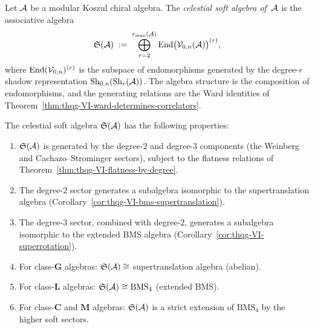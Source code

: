 \begin{definition}
\label{def:thqg-VI-celestial-soft-algebra}
Let $\mathcal{A}$ be a modular Koszul chiral algebra. The
\emph{celestial soft algebra of~$\mathcal{A}$} is the associative algebra
\begin{equation}\label{eq:thqg-VI-celestial-soft-algebra}
\mathfrak{S}(\mathcal{A})
\;:=\;
\bigoplus_{r=2}^{r_{\max}(\mathcal{A})}
\operatorname{End}\bigl(\mathcal{V}_{0,n}(\mathcal{A})\bigr)^{(r)},
\end{equation}
where $\operatorname{End}(\mathcal{V}_{0,n})^{(r)}$ is the subspace of endomorphisms
generated by the degree-$r$ shadow representation
$\operatorname{Sh}_{0,n}(\operatorname{Sh}_r(\mathcal{A}))$. The algebra structure is the
composition of endomorphisms, and the generating relations are
the Ward identities of
Theorem~\ref{thm:thqg-VI-ward-determines-correlators}.
\end{definition}

\begin{proposition}
\label{prop:thqg-VI-celestial-structure}
The celestial soft algebra $\mathfrak{S}(\mathcal{A})$ has the following
properties:
\begin{enumerate}[label=\textup{(\roman*)}]
\item $\mathfrak{S}(\mathcal{A})$ is generated by the degree-$2$ and
 degree-$3$ components (the Weinberg and Cachazo--Strominger
 sectors), subject to the flatness relations of
 Theorem~\ref{thm:thqg-VI-flatness-by-degree}.
\item The degree-$2$ sector generates a subalgebra isomorphic to
 the supertranslation algebra
 (Corollary~\ref{cor:thqg-VI-bms-supertranslation}).
\item The degree-$3$ sector, combined with degree-$2$, generates a
 subalgebra isomorphic to the extended BMS algebra
 (Corollary~\ref{cor:thqg-VI-superrotation}).
\item For class-$\mathbf{G}$ algebras:
 $\mathfrak{S}(\mathcal{A}) \cong$ supertranslation algebra (abelian).
\item For class-$\mathbf{L}$ algebras:
 $\mathfrak{S}(\mathcal{A}) \cong \mathrm{BMS}_4$ (extended BMS).
\item For class-$\mathbf{C}$ and $\mathbf{M}$ algebras:
 $\mathfrak{S}(\mathcal{A})$ is a strict extension of $\mathrm{BMS}_4$
 by the higher soft sectors.
\end{enumerate}
\end{proposition}


